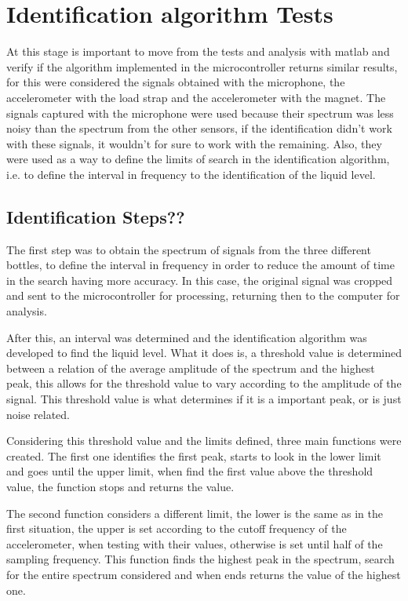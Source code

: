\section{Identification algorithm Tests}
At this stage is important to move from the tests and analysis with \acrshort{matlab} and verify if the algorithm implemented in the microcontroller returns similar results, for this were considered the signals obtained with the microphone, the accelerometer with the load strap and the accelerometer with the magnet. The signals captured with the microphone were used because their spectrum was less noisy than the spectrum from the other sensors, if the identification didn't work with these signals, it wouldn't for sure to work with the remaining. Also, they were used as a way to define the limits of search in the identification algorithm, i.e. to define the interval in frequency to the identification of the liquid level.  
\subsection{Identification Steps??}
The first step was to obtain the spectrum of signals from the three different bottles, to define the interval in frequency in order to reduce the amount of time in the search having more accuracy. In this case, the original signal was cropped and sent to the microcontroller for processing, returning then to the computer for analysis.

After this, an interval was determined and the identification algorithm was developed to find the liquid level. What it does is, a threshold value is determined between a relation of the average amplitude of the spectrum and the highest peak, this allows for the threshold value to vary according to the amplitude of the signal. This threshold value is what determines if it is a important peak, or is just noise related. 

Considering this threshold value and the limits defined, three main functions were created. The first one identifies the first peak, starts to look in the lower limit and goes until the upper limit, when find the first value above the threshold value, the function stops and returns the value.

The second function considers a different limit, the lower is the same as in the first situation, the upper is set according to the cutoff frequency of the accelerometer, when testing with their values, otherwise is set until half of the sampling frequency. This function finds the highest peak in the spectrum, search for the entire spectrum considered and when ends returns the value of the highest one.

